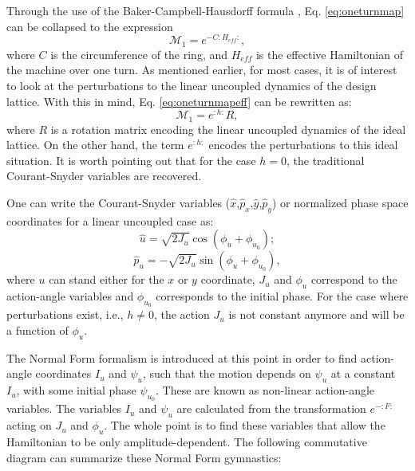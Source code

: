 Through the use of the Baker-Campbell-Hausdorff formula \cite{bch}, Eq. \ref{eq:oneturnmap} can be collapsed to the expression 
\begin{equation}
    \label{eq:oneturnmapeff}
    \mathcal{M}_1=e^{-C :H_{eff}:},
\end{equation}
where $C$ is the circumference of the ring, and $H_{eff}$ is the effective Hamiltonian of the machine over one turn. As mentioned earlier, for most cases, it is of interest to look at the perturbations to the linear uncoupled dynamics of the design lattice. With this in mind, Eq. \ref{eq:oneturnmapeff} can be rewritten as:
\begin{equation}
    \label{eq:oneturnmapeff1}
    \mathcal{M}_1=e^{:h:}R,
\end{equation}
where $R$ is a rotation matrix encoding the linear uncoupled dynamics of the ideal lattice. On the other hand, the term $e^{:h:}$ encodes the perturbations to this ideal situation. It is worth pointing out that for the case $h=0$, the traditional Courant-Snyder variables are recovered.   

One can write the Courant-Snyder variables ($\hat{x}$,$\hat{p}_x$,$\hat{y}$,$\hat{p}_y$) or normalized phase space coordinates for a linear uncoupled case as:
\begin{equation}
    \label{eq:norm1}
    \hat{u}=\sqrt{2J_u} \cos \left( \phi_u + \phi_{u_0}\right);
\end{equation}
\begin{equation}
    \label{eq:norm2}
    \hat{p}_u=-\sqrt{2J_u} \sin \left( \phi_u + \phi_{u_0}\right),
\end{equation}
where $u$ can stand either for the $x$ or $y$ coordinate, $J_u$ and $\phi_u$ correspond to the action-angle variables and $\phi_{u_0}$ corresponds to the initial phase. For the case where perturbations exist, i.e., $h \neq 0$, the action $J_u$ is not constant anymore and will be a function of $\phi_u$.  

The Normal Form formalism is introduced at this point in order to find action-angle coordinates $I_u$ and $\psi_u$, such that the motion depends on $\psi_u$ at a constant $I_u$, with some initial phase $\psi_{u_0}$. These are known as non-linear action-angle variables. The variables $I_u$ and $\psi_u$ are calculated from the transformation $e^{-:F:}$ acting on $J_u$ and $\phi_u$. The whole point is to find these variables that allow the Hamiltonian to be only amplitude-dependent. The following commutative diagram can summarize these Normal Form gymnastics: 

